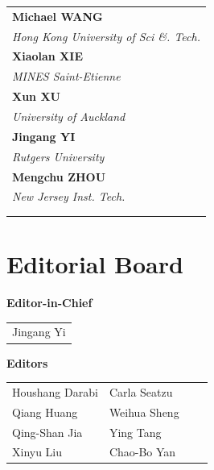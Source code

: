 \documentclass[
	openany, %
	parskip=full, %
	12pt, %
	a4paper, %
]{conferencebooklet} %
\begin{document}
\begin{table}[h!]
{\begin{tabular}{p{75mm}}
            \textbf{Michael WANG} \\
            \textit{Hong Kong University of Sci \&. Tech.} \vspace{2mm} \\ 
            \textbf{Xiaolan XIE} \\
            \textit{MINES Saint-Etienne} \vspace{2mm} \\ 
            \textbf{Xun XU} \\
            \textit{University of Auckland} \vspace{2mm} \\ 
            \textbf{Jingang YI} \\
            \textit{Rutgers University} \vspace{2mm} \\ 
            \textbf{Mengchu ZHOU} \\
            \textit{New Jersey Inst. Tech.} \vspace{2mm} \\ 
            \\
            \\ 
        \end{tabular}
    }
\end{table}

\vfill\null

\section{Editorial Board}

\large \textbf{Editor-in-Chief} \normalsize
\begin{table}[h!]
    \begin{tabular}{l}
        Jingang	Yi 
    \end{tabular}
\end{table}


\large \textbf{Editors} \normalsize
\begin{table}[h!]
    \begin{tabular}{p{42mm}p{46mm}p{32mm}l}
         Houshang	Darabi	&
         Carla	Seatzu	\\
         Qiang	Huang  &	
         Weihua	Sheng	\\
         Qing-Shan	Jia	&
         Ying	Tang \\
         Xinyu	Liu	 &
         Chao-Bo	Yan	
    \end{tabular}
\end{table}
\end{document}
